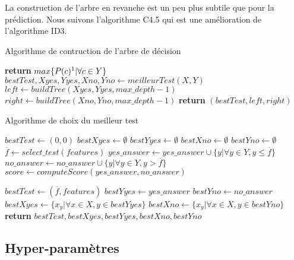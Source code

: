 \documentclass[french, 14pt]{memoir}
\begin{document}
La construction de l'arbre en revanche est un peu plus subtile que pour la prédiction. Nous suivons l'algorithme C4.5 qui est une amélioration de l'algorithme ID3.

\begin{algorithm}
\begin{minipage}[t]{20cm}
\caption{Algorithme de contruction de l'arbre de décision}
\label{buildTree}
\begin{algorithmic}[1]
\State \textbf{return} $max\{P(c)\footnote{où P(c) est la probabilité d'apparition de la classe c dans Y}|\forall c \in Y\}$
\Else
\State $bestTest, Xyes, Yyes, Xno, Yno \gets meilleurTest(X, Y)$
\State $left \gets buildTree(Xyes, Yyes, max\_depth - 1)$
\State $right \gets buildTree(Xno, Yno, max\_depth - 1)$
\State \textbf{return} $(bestTest, left, right)$
\EndIf
\EndFunction
\end{algorithmic}
\end{minipage}
\end{algorithm}

\begin{algorithm}
\begin{minipage}[t]{20cm}
\caption{Algorithme de choix du meilleur test}
\label{getBestTest}
\begin{algorithmic}[1]
\State $bestTest \gets (0,0)$
\State $bestXyes \gets \emptyset$
\State $bestYyes \gets \emptyset$
\State $bestXno \gets \emptyset$
\State $bestYno \gets \emptyset$
\State $\overline{f} \gets select\_test(features)$
\State $yes\_answer \gets yes\_answer \cup \{y | \forall y \in Y, y \leq \overline{f} \}$
\State $no\_answer \gets no\_answer \cup \{y | \forall y \in Y, y > \overline{f} \}$
\State $score \gets computeScore(yes\_answer, no\_answer)$

\State $bestTest \gets (\overline{f}, features)$
\State $bestYyes \gets yes\_answer$
\State $bestYno \gets no\_answer$
 \State $bestXyes \gets \{x_y |\forall x \in X, y \in bestYyes\}$
 \State $bestXno \gets \{x_y |\forall x \in X, y \in bestYno\}$
\EndIf
\EndFor
\State \textbf{return} $bestTest, bestXyes, bestYyes, bestXno, bestYno$
\EndFunction
\end{algorithmic}
\end{minipage}
\end{algorithm}


\subsection{Hyper-paramètres}
\end{document}
